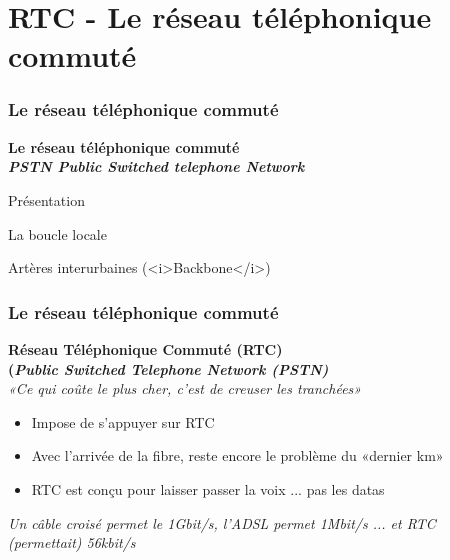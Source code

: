 \section{RTC - Le réseau téléphonique commuté}

\begin{frame}[fragile]
	\frametitle{Le réseau téléphonique commuté}
\begin{center}
	\Huge{\bf\color{blue}Le réseau téléphonique commuté \\ 
	\LARGE\it PSTN Public Switched telephone Network}
\end{center}
\begin{flushright}
  \item Présentation
  \item La boucle locale
  \item Artères interurbaines (<i>Backbone</i>)
\end{flushright}
\end{frame}


\begin{frame}[fragile]
  \frametitle{Le réseau téléphonique commuté}
{\large\bf Réseau Téléphonique Commuté (RTC) \\
(\textit{Public Switched Telephone Network (PSTN)}}\\
\textit{«Ce qui coûte le plus cher, c'est de creuser les tranchées»}
\begin{itemize}
	\item Impose de s'appuyer sur RTC
	\item Avec l'arrivée de la fibre, reste encore le problème du «dernier km»
	\item RTC est conçu pour laisser passer la voix ... pas les datas
\end{itemize}
\vspace{1cm}
\textit{Un câble croisé permet le 1Gbit/s, l'ADSL permet 1Mbit/s ... et RTC
(permettait) 56kbit/s}
\end{frame}

